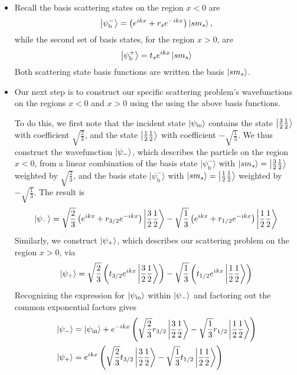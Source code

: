 \documentclass[11pt, a4paper]{article}
\newcommand{\p}{\psi}  %
\newcommand{\bket}[1]{\big | {#1} \big \rangle}  %
\begin{document}
\begin{itemize}
	\item Recall the basis scattering states on the region $ x < 0 $ are
	\begin{equation*}
		\bket{\psi_{\text{b}}^{-}} = \left(e^{ik x} + r_{s}e^{-ik x}\right)\ket{sm_{s}},
	\end{equation*}
	while the second set of basis states, for the region $ x > 0 $, are
	\begin{equation*}
		\bket{\psi_{\text{b}}^{+}} = t_{s} e^{ikx}\ket{sm_{s}}
	\end{equation*}
	Both scattering state basis functions are written the basis $ \ket{sm_{s}} $.
	
	\item Our next step is to construct our specific scattering problem's wavefunctions on the regions $ x < 0 $ and $ x > 0 $ using the using the above basis functions. 
	
	To do this, we first note that the incident state $ \ket{\psi_{\text{in}}} $ contains the state $ \ket{\tfrac{3}{2}\tfrac{1}{2}} $ with coefficient $ \sqrt{\tfrac{2}{3}} $, and the state $ \ket{\tfrac{1}{2}\tfrac{1}{2}} $ with coefficient $ -\sqrt{\tfrac{1}{3}} $. We thus construct the wavefunction $ \ket{\psi_{-}} $, which describes the particle on the region $ x < 0 $, from a linear combination of the basis state $ \bket{\psi_{\text{b}}^{-}} $ with $ \ket{sm_{s}} = \ket{\tfrac{3}{2}\tfrac{1}{2}} $ weighted by $  \sqrt{\tfrac{2}{3}}  $, and the basis state $ \bket{\psi_{\text{b}}^{-}} $ with $ \ket{sm_{s}} = \ket{\tfrac{1}{2}\tfrac{1}{2}}  $ weighted by $ -\sqrt{\tfrac{1}{3}}  $. The result is 
	\begin{equation*}
		\ket{\psi_{-}} = \sqrt{\frac{2}{3}}\left(e^{ikx} + r_{3/2}e^{-ikx}\right)\ket{\frac{3}{2}\frac{1}{2}} - \sqrt{\frac{1}{3}}\left(e^{ikx} + r_{1/2}e^{-ikx}\right)\ket{\frac{1}{2}\frac{1}{2}}
	\end{equation*}
	Similarly, we construct $ \ket{\psi_{\text{+}}} $, which describes our scattering problem on the region $ x > 0 $, via
	\begin{equation*}
		\ket{\psi_{+}} = \sqrt{\frac{2}{3}}\left(t_{3/2}e^{ikx}\ket{\frac{3}{2}\frac{1}{2}}\right) - \sqrt{\frac{1}{3}}\left(t_{1/2}e^{ikx}\ket{\frac{1}{2}\frac{1}{2}} \right)
	\end{equation*}
	Recognizing the expression for $ \ket{\psi_{\text{in}}} $ within $ \ket{\psi_{-}} $ and factoring out the common exponential factors gives
	\begin{align*}
		&\ket{\psi_{-}}= \ket{\psi_{\text{in}}} + e^{-ikx}\left( \sqrt{\frac{2}{3}} r_{3/2}\ket{\frac{3}{2}\frac{1}{2}} - \sqrt{\frac{1}{3}} r_{1/2}\ket{\frac{1}{2}\frac{1}{2}} \right)\\
		&\ket{\psi_{+}} = 	e^{ikx}\left(\sqrt{\frac{2}{3}}t_{3/2}\ket{\frac{3}{2}\frac{1}{2}} - \sqrt{\frac{1}{3}}t_{1/2}\ket{\frac{1}{2}\frac{1}{2}}\right)
	\end{align*}
	

\end{itemize}
\end{document}
